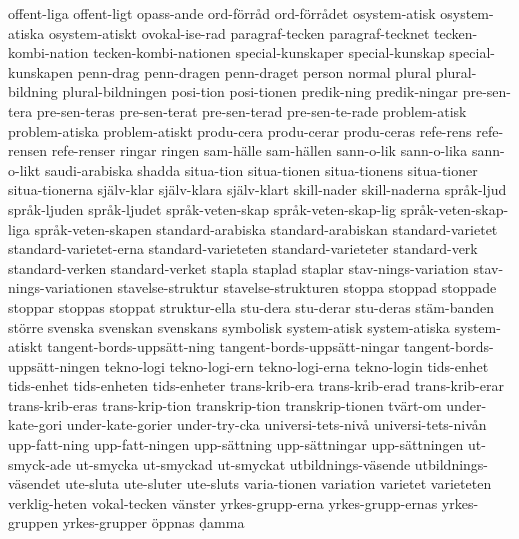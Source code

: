 {offent-liga
offent-ligt
opass-ande
ord-förråd
ord-förrådet
osystem-atisk
osystem-atiska
osystem-atiskt
ovokal-ise-rad
paragraf-tecken
paragraf-tecknet
tecken-kombi-nation
tecken-kombi-nationen
special-kunskaper
special-kunskap
special-kunskapen
penn-drag
penn-dragen
penn-draget
person
normal
plural
plural-bildning
plural-bildningen
posi-tion
posi-tionen
predik-ning
predik-ningar
pre-sen-tera
pre-sen-teras
pre-sen-terat
pre-sen-terad
pre-sen-te-rade
problem-atisk
problem-atiska
problem-atiskt
produ-cera
produ-cerar
produ-ceras
refe-rens
refe-rensen
refe-renser
ringar
ringen
sam-hälle
sam-hällen
sann-o-lik
sann-o-lika
sann-o-likt
saudi-arabiska
shadda
situa-tion
situa-tionen
situa-tionens
situa-tioner
situa-tionerna
själv-klar
själv-klara
själv-klart
skill-nader
skill-naderna
språk-ljud
språk-ljuden
språk-ljudet
språk-veten-skap
språk-veten-skap-lig
språk-veten-skap-liga
språk-veten-skapen
standard-arabiska
standard-arabiskan
standard-varietet
standard-varietet-erna
standard-varieteten
standard-varieteter
standard-verk
standard-verken
standard-verket
stapla
staplad
staplar
stav-nings-variation
stav-nings-variationen
stavelse-struktur
stavelse-strukturen
stoppa
stoppad
stoppade
stoppar
stoppas
stoppat
struktur-ella
stu-dera
stu-derar
stu-deras
stäm-banden
större
svenska
svenskan
svenskans
symbolisk
system-atisk
system-atiska
system-atiskt
tangent-bords-uppsätt-ning
tangent-bords-uppsätt-ningar
tangent-bords-uppsätt-ningen
tekno-logi
tekno-logi-ern
tekno-logi-erna
tekno-login
tids-enhet
tids-enhet
tids-enheten
tids-enheter
trans-krib-era
trans-krib-erad
trans-krib-erar
trans-krib-eras
trans-krip-tion
transkrip-tion
transkrip-tionen
tvärt-om
under-kate-gori
under-kate-gorier
under-try-cka
universi-tets-nivå
universi-tets-nivån
upp-fatt-ning
upp-fatt-ningen
upp-sättning
upp-sättningar
upp-sättningen
ut-smyck-ade
ut-smycka
ut-smyckad
ut-smyckat
utbildnings-väsende
utbildnings-väsendet
ute-sluta
ute-sluter
ute-sluts
varia-tionen
variation
varietet
varieteten
verklig-heten
vokal-tecken
vänster
yrkes-grupp-erna
yrkes-grupp-ernas
yrkes-gruppen
yrkes-grupper
öppnas
ḍamma
}
